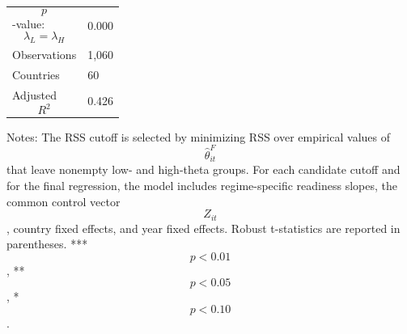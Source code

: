 \begin{table}[H]
\begin{threeparttable}
\begin{tabularx}{\textwidth}{lY}
$$p$$-value: $$\lambda_L=\lambda_H$$ & 0.000 \\
Observations & 1,060 \\
Countries & 60 \\
Adjusted $$R^2$$ & 0.426 \\
\bottomrule
\end{tabularx}
\begin{tablenotes}[flushleft]\footnotesize
\item Notes: The RSS cutoff is selected by minimizing RSS over empirical values of $$\widehat{\theta}^{F}_{it}$$ that leave nonempty low- and high-theta groups. For each candidate cutoff and for the final regression, the model includes regime-specific readiness slopes, the common control vector $$Z_{it}$$, country fixed effects, and year fixed effects. Robust t-statistics are reported in parentheses. *** $$p<0.01$$, ** $$p<0.05$$, * $$p<0.10$$.
\end{tablenotes}
\end{threeparttable}
\end{table}
